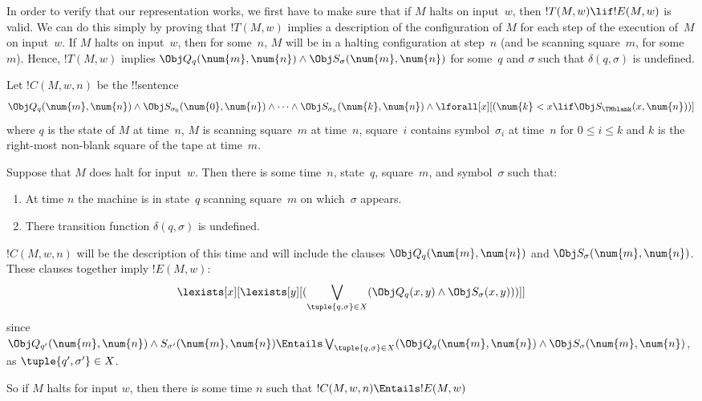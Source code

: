 \documentclass[../../../include/open-logic-section]{subfiles}
\begin{document}

\begin{explain}
In order to verify that our representation works, we first have to
make sure that if $M$ halts on input~$w$, then $!T(M, w) \lif !E(M,
w)$ is valid. We can do this simply by proving that $!T(M, w)$ implies
a description of the configuration of $M$ for each step of the
execution of~$M$ on input~$w$. If $M$ halts on input~$w$, then for
some~$n$, $M$ will be in a halting configuration at step~$n$ (and be
scanning square~$m$, for some $m$). Hence, $!T(M, w)$ implies $\Obj
Q_q(\num{m}, \num{n}) \land \Obj S_\sigma(\num{m}, \num{n})$ for
some~$q$ and $\sigma$ such that $\delta(q, \sigma)$ is undefined.
\end{explain}

\begin{defn} 
Let $!C(M, w, n)$ be the !!{sentence}
\[ 
\Obj Q_q(\num{m}, \num{n}) \land \Obj S_{\sigma_0}(\num{0}, \num{n})
\land \dots \land \Obj S_{\sigma_k}(\num{k}, \num{n}) \land
\lforall[x][(\num{k} < x \lif \Obj S_\TMblank(x, \num{n}))]
\] 
where $q$ is the state
of $M$ at time~$n$, $M$ is scanning square~$m$ at time~$n$, square~$i$
contains symbol~$\sigma_i$ at time~$n$ for $0 \le i \le k$ and $k$ is the
right-most non-blank square of the tape at time~$m$. 
\end{defn}

Suppose that $M$ does halt for input~$w$. Then there is some
time~$n$, state~$q$, square~$m$, and symbol~$\sigma$ such that:
\begin{enumerate} 
\item At time $n$ the machine is in state~$q$ scanning square~$m$ on
  which~$\sigma$ appears.
\item There transition function $\delta(q, \sigma)$ is undefined.
\end{enumerate}

$!C(M, w, n)$ will be the description of this time and will include
the clauses $\Obj Q_{q}(\num{m}, \num{n})$ and $\Obj
S_{\sigma}(\num{m}, \num{n})$. These clauses together imply $!E(M,
w)$:
\[
\lexists[x][\lexists[y][(\bigvee_{\tuple{q, \sigma} \in
      X}(\Obj Q_q(x, y) \land \Obj S_\sigma(x, y)))]]
\]
since $\Obj Q_{q'}(\num{m}, \num{n}) \land S_{\sigma'}(\num{m},
\num{n}) \Entails \bigvee_{\tuple{q, \sigma} \in X} (\Obj Q_q(\num{m},
\num{n}) \land \Obj S_{\sigma}(\num{m}, \num{n})$, as
$\tuple{q',\sigma'} \in X$.

So if $M$ halts for input $w$, then there is some time $n$ such that
$!C(M, w, n) \Entails !E(M,w)$
\end{document}
